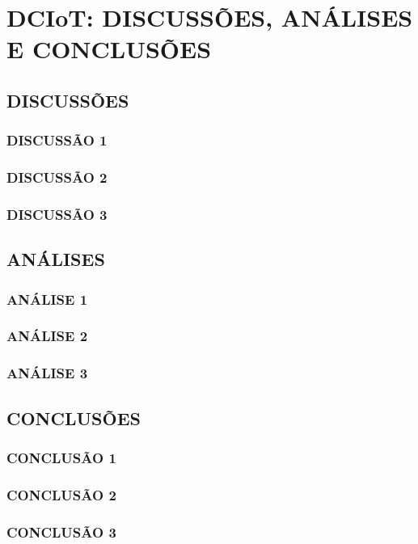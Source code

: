 \chapter{DCIoT: DISCUSSÕES, ANÁLISES E CONCLUSÕES}
\label{cap:plano de custos}


\section{DISCUSSÕES}

\subsection{DISCUSSÃO 1}

\subsection{DISCUSSÃO 2}

\subsection{DISCUSSÃO 3}


\section{ANÁLISES }

\subsection{ANÁLISE 1}

\subsection{ANÁLISE 2}

\subsection{ANÁLISE 3}


\section{CONCLUSÕES}

\subsection{CONCLUSÃO 1}

\subsection{CONCLUSÃO 2}

\subsection{CONCLUSÃO 3}

